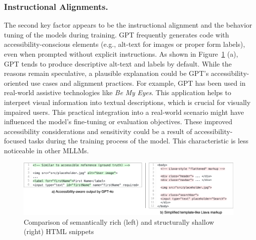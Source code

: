 \subsubsection{Instructional Alignments.} The second key 
factor appears to be the instructional alignment
and the behavior tuning of the models during training. GPT 
frequently generates code with accessibility-conscious elements
(e.g., alt-text for images or proper form labels), even when 
prompted without explicit instructions. As shown in 
Figure~\ref{fig:generalcapabilities} (a), GPT tends to produce 
descriptive alt-text and labels by default.\newline
While the reasons remain speculative, a plausible explanation 
could be GPT's accessibility-oriented use cases and 
alignment practices. For example, GPT has been used 
in real-world assistive technologies like \textit{Be My Eyes}. 
This application helps to interpret visual information into 
textual descriptions, which is crucial for visually impaired users.
This practical integration into a real-world scenario might 
have influenced the model's fine-tuning or evaluation objectives.
These improved accessibility considerations and sensitivity could 
be a result of accessibility-focused tasks during the training 
process of the model. This characteristic is less noticeable in 
other MLLMs.

\begin{figure}
  \centering
  \includegraphics[width=1\linewidth]{figures/generalcapability.png}
  \caption{Comparison of semantically rich (left) and structurally shallow (right) HTML snippets}
  \label{fig:generalcapabilities} 
\end{figure}

